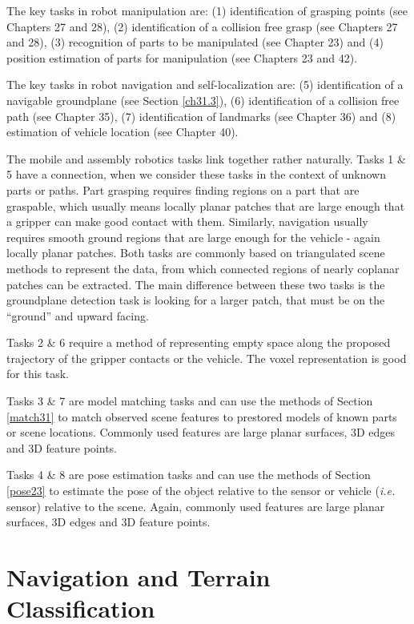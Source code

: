 \documentclass[twocolumn,oneside]{book}
\begin{document}
The key tasks in robot manipulation are:
(1) identification of grasping points (see Chapters 27 and 28),
(2) identification of a collision free grasp (see Chapters 27 and 28),
(3) recognition of parts to be manipulated (see Chapter 23) and
(4) position estimation of parts for manipulation (see Chapters 23 and 42).

The key tasks in robot navigation and self-localization are:
(5) identification of a navigable groundplane (see Section \ref{ch31.3}),
(6) identification of a collision free path (see Chapter 35),
(7) identification of landmarks (see Chapter 36) and
(8) estimation of vehicle location (see Chapter 40).

The mobile and assembly robotics tasks link together rather
naturally.
Tasks 1 \& 5 have a connection, when we consider these tasks
in the context of unknown parts or paths. Part grasping requires
finding regions on a part that are graspable, which usually means locally
planar patches that are large enough that a gripper can make good contact
with them.
Similarly, navigation usually requires smooth ground regions that are
large enough for the vehicle - again locally planar patches.
Both tasks are commonly based on triangulated scene methods to
represent the data, from which connected regions of nearly coplanar
patches can be extracted.
The main difference between these two tasks is the groundplane
detection task is looking for a larger patch, that must be on the
``ground'' and upward facing.

Tasks 2 \& 6 require a method of representing empty space along the 
proposed trajectory of the gripper contacts or the vehicle.
The voxel representation is good for this task.

Tasks 3 \& 7 are model matching tasks and can use the methods of
Section \ref{match31} to match observed scene features to prestored
models of known parts or scene locations.
Commonly used features are large planar surfaces, 3D edges and 3D feature
points.

Tasks 4 \& 8 are pose estimation tasks and can use the methods of
Section \ref{pose23} to estimate the pose of the object 
relative to the sensor or vehicle ({\it i.e.} sensor) relative to the scene.
Again, commonly used features are large planar surfaces, 3D edges and 3D feature
points.


\section{Navigation and Terrain Classification  \label{ch31.3}}
\end{document}
